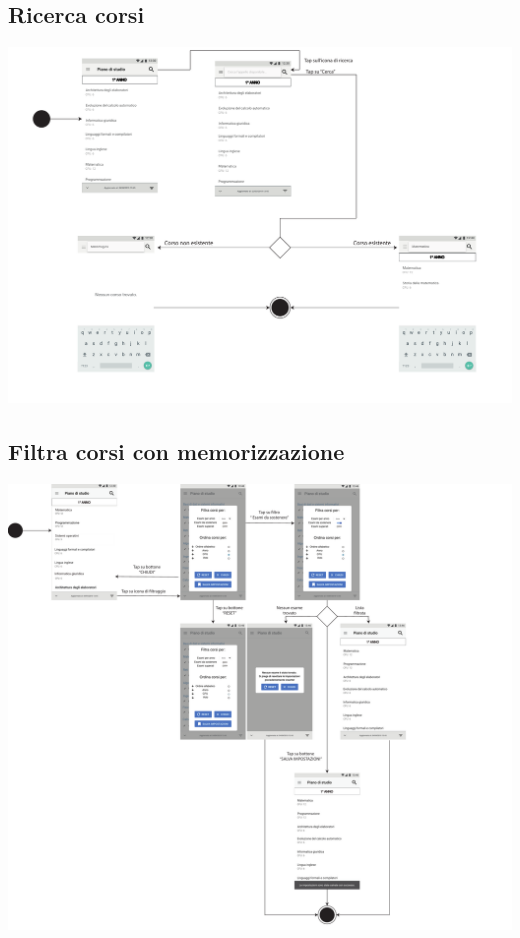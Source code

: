 \subsection{Ricerca corsi }
\begin{center}
	\includegraphics[width=6in]{imgs/gruppo1/activity_diagrams/AD2_ricerca_corsi.pdf}
\end{center}
\newpage


\subsection{Filtra corsi con memorizzazione  }
\begin{center}
	\includegraphics[width=6in]{imgs/gruppo1/activity_diagrams/AD3_filtra_corsi.pdf}
\end{center}
\newpage

